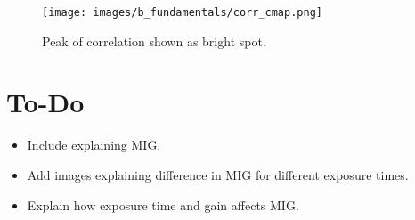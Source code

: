     \begin{figure}[h]
        \hspace{40pt}
        \texttt{[image: images/b\_fundamentals/corr\_cmap.png]}
        \caption{Peak of correlation shown as bright spot.}
        \label{fig:corr_cmap.png}
    \end{figure}

    \section{To-Do}
    \begin{itemize}
        \item Include explaining MIG.
        \item Add images explaining difference in MIG for different exposure times.
        \item Explain how exposure time and gain affects MIG.
    \end{itemize}

    \clearpage